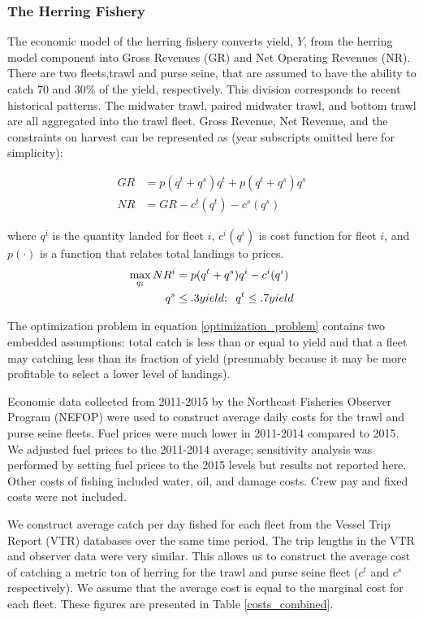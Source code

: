 \documentclass[]{article}
\begin{document}
\subsubsection{The Herring Fishery}\label{the-herring-fishery}

The economic model of the herring fishery converts yield, \(Y\), from
the herring model component into Gross Revenues (GR) and Net Operating
Revenues (NR). There are two fleets,trawl and purse seine, that are
assumed to have the ability to catch 70 and 30\% of the yield,
respectively. This division corresponds to recent historical patterns.
The midwater trawl, paired midwater trawl, and bottom trawl are all
aggregated into the trawl fleet. Gross Revenue, Net Revenue, and the
constraints on harvest can be represented as (year subscripts omitted
here for simplicity):

\begin{align}
GR&=p(q^t+q^s)q^t+p(q^t+q^s)q^s\\
NR&=GR-c^t(q^t)-c^s(q^s)
\end{align}

where \(q^i\) is the quantity landed for fleet \(i\), \(c^i(q^i)\) is
cost function for fleet \(i\), and \(p(\cdot)\) is a function that
relates total landings to prices.\\

\begin{align}
\label{optimization_problem}
\max_{q_i} NR^i&=p(q^t+q^s)q^i - c^i(q^i)\\
q^s &\leq .3yield; \hspace{2mm} q^t \leq .7yield 
\end{align}

The optimization problem in equation \ref{optimization_problem} contains
two embedded assumptions: total catch is less than or equal to yield and
that a fleet may catching less than its fraction of yield (presumably
because it may be more profitable to select a lower level of landings).

Economic data collected from 2011-2015 by the Northeast Fisheries
Observer Program (NEFOP) were used to construct average daily costs for
the trawl and purse seine fleets. Fuel prices were much lower in
2011-2014 compared to 2015. We adjusted fuel prices to the 2011-2014
average; sensitivity analysis was performed by setting fuel prices to
the 2015 levels but results not reported here. Other costs of fishing
included water, oil, and damage costs. Crew pay and fixed costs were not
included.

We construct average catch per day fished for each fleet from the Vessel
Trip Report (VTR) databases over the same time period. The trip lengths
in the VTR and observer data were very similar. This allows us to
construct the average cost of catching a metric ton of herring for the
trawl and purse seine fleet (\(c^t\) and \(c^s\) respectively). We
assume that the average cost is equal to the marginal cost for each
fleet. These figures are presented in Table \ref{costs_combined}.
\end{document}
